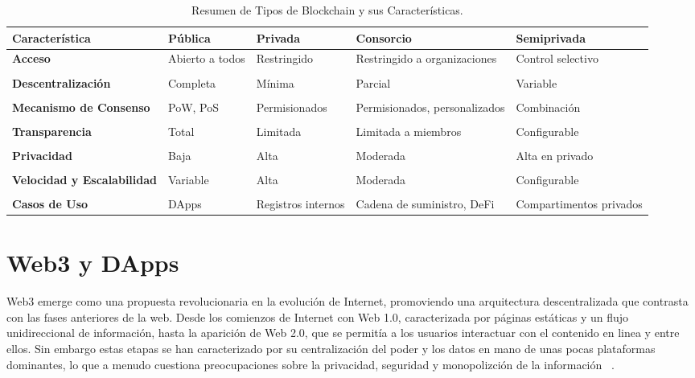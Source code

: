 \begin{table}
\small
\begin{centering}
		\begin{tabular}{@{}p{3.3cm} p{2cm} p{2.5cm} p{2.5cm} p{2.5cm}@{}}
		\toprule
		\textbf{Característica} & \textbf{Pública} & \textbf{Privada} & \textbf{Consorcio} & \textbf{Semiprivada} \\ 
		\midrule
		\textbf{Acceso} & Abierto a todos & Restringido & Restringido a organizaciones & Control selectivo \\\\
		\textbf{Descentralización} & Completa & Mínima & Parcial & Variable \\\\
		\textbf{Mecanismo de Consenso} & PoW, PoS & Permisionados & Permisionados, personalizados & Combinación \\\\
		\textbf{Transparencia} & Total & Limitada & Limitada a miembros & Configurable \\\\
		\textbf{Privacidad} & Baja & Alta & Moderada & Alta en privado \\\\
		\textbf{Velocidad y Escalabilidad} & Variable & Alta & Moderada & Configurable \\\\
		\textbf{Casos de Uso} & DApps & Registros internos & Cadena de suministro, DeFi & Compartimentos privados \\
		\bottomrule
		\end{tabular}
\end{centering}
\caption{Resumen de Tipos de Blockchain y sus Características.}
\label{tabla_blockchain_caracteristicas}	
\end{table}

\section{Web3 y DApps}

Web3 emerge como una propuesta revolucionaria en la evolución de Internet, promoviendo una arquitectura descentralizada que contrasta con las fases anteriores de la web.
Desde los comienzos de Internet con Web 1.0, caracterizada por páginas estáticas y un flujo unidireccional de información, hasta la aparición de Web 2.0, que se permitía a los usuarios interactuar con el contenido en linea y entre ellos. 
Sin embargo estas etapas se han caracterizado por su centralización del poder y los datos en mano de unas pocas plataformas dominantes, lo que a menudo cuestiona preocupaciones sobre la privacidad, seguridad y monopolizción de la información ~\cite{Web3}. 

